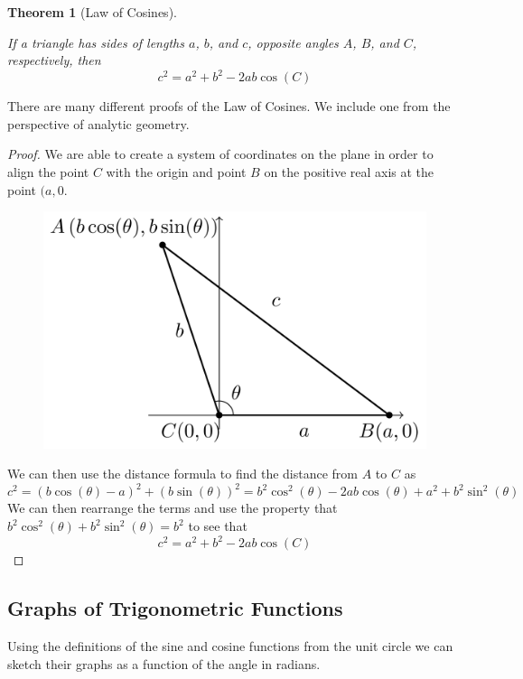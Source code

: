 \documentclass[
]{book}
\newtheorem{theorem}{Theorem}[chapter]
\theoremstyle{definition}
\theoremstyle{definition}
\theoremstyle{definition}
\theoremstyle{definition}
\theoremstyle{remark}
\begin{document}
\begin{theorem}[Law of Cosines]
\protect\hypertarget{thm:unlabeled-div-139}{}\label{thm:unlabeled-div-139}

If a triangle has sides of lengths \(a\), \(b\), and \(c\), opposite angles \(A\), \(B\), and \(C\), respectively, then
\[c^2=a^2+b^2 -2ab\cos(C)\]

\end{theorem}

There are many different proofs of the Law of Cosines. We include one from the perspective of analytic geometry.

\begin{proof}

We are able to create a system of coordinates on the plane in order to align the point \(C\) with the origin and point \(B\) on the positive real axis at the point \((a,0\).

\begin{figure}

{\centering \includegraphics[width=0.4\linewidth]{tikz/law-of-cosines} 

}

\end{figure}

We can then use the distance formula to find the distance from \(A\) to \(C\) as
\[c^2=\left(b\cos(\theta)-a\right)^2 + (b\sin(\theta))^2= b^2 \cos^2(\theta)-2ab\cos(\theta) + a^2 + b^2 \sin^2(\theta)\]
We can then rearrange the terms and use the property that \(b^2\cos^2(\theta) + b^2\sin^2(\theta) = b^2\) to see that
\[c^2=a^2+b^2 -2ab\cos(C)\]

\end{proof}

\hypertarget{graphs-of-trigonometric-functions}{%
\subsection{Graphs of Trigonometric Functions}\label{graphs-of-trigonometric-functions}}

Using the definitions of the sine and cosine functions from the unit circle we can sketch their graphs as a function of the angle in radians.
\end{document}
